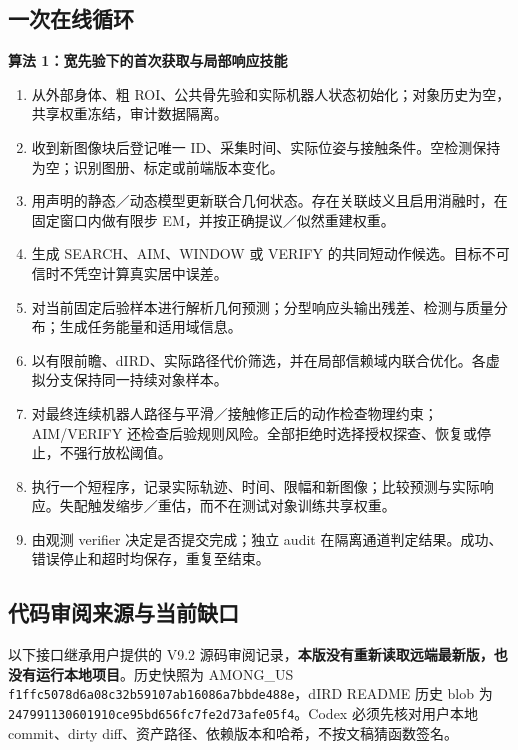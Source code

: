 \documentclass[UTF8,fontset=fandol,11pt,a4paper]{ctexart}
\theoremstyle{plain}
\theoremstyle{definition}
\theoremstyle{remark}
\numberwithin{equation}{section}
\newcommand{\code}[1]{\begingroup\small\nolinkurl{#1}\endgroup}
\begin{document}
\subsection{一次在线循环}
\begin{scopebox}
\textbf{算法 1：宽先验下的首次获取与局部响应技能}
\begin{enumerate}
\item 从外部身体、粗 ROI、公共骨先验和实际机器人状态初始化；对象历史为空，共享权重冻结，审计数据隔离。
\item 收到新图像块后登记唯一 ID、采集时间、实际位姿与接触条件。空检测保持为空；识别图册、标定或前端版本变化。
\item 用声明的静态／动态模型更新联合几何状态。存在关联歧义且启用消融时，在固定窗口内做有限步 EM，并按正确提议／似然重建权重。
\item 生成 SEARCH、AIM、WINDOW 或 VERIFY 的共同短动作候选。目标不可信时不凭空计算真实居中误差。
\item 对当前固定后验样本进行解析几何预测；分型响应头输出残差、检测与质量分布；生成任务能量和适用域信息。
\item 以有限前瞻、dIRD、实际路径代价筛选，并在局部信赖域内联合优化。各虚拟分支保持同一持续对象样本。
\item 对最终连续机器人路径与平滑／接触修正后的动作检查物理约束；AIM/VERIFY 还检查后验规则风险。全部拒绝时选择授权探查、恢复或停止，不强行放松阈值。
\item 执行一个短程序，记录实际轨迹、时间、限幅和新图像；比较预测与实际响应。失配触发缩步／重估，而不在测试对象训练共享权重。
\item 由观测 verifier 决定是否提交完成；独立 audit 在隔离通道判定结果。成功、错误停止和超时均保存，重复至结束。
\end{enumerate}
\end{scopebox}

\subsection{代码审阅来源与当前缺口}
以下接口继承用户提供的 V9.2 源码审阅记录\cite{v92,codex92}，\textbf{本版没有重新读取远端最新版，也没有运行本地项目}。历史快照为 AMONG\_US \code{f1ffc5078d6a08c32b59107ab16086a7bbde488e}，dIRD README 历史 blob 为 \code{247991130601910ce95bd656fc7fe2d73afe05f4}。Codex 必须先核对用户本地 commit、dirty diff、资产路径、依赖版本和哈希，不按文稿猜函数签名。
\end{document}
